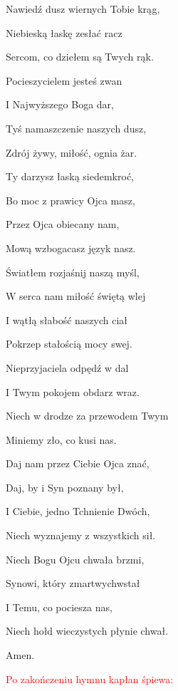 \begin{Parallel}[v]{0.45\textwidth}{0.52\textwidth}
{Nawiedź dusz wiernych Tobie krąg,

Niebieską łaskę zesłać racz

Sercom, co dziełem są Twych rąk.

\quad Pocieszycielem jesteś zwan

I Najwyższego Boga dar,

Tyś namaszczenie naszych dusz,

Zdrój żywy, miłość, ognia żar.

\quad Ty darzysz łaską siedemkroć,

Bo moc z prawicy Ojca masz,

Przez Ojca obiecany nam,

Mową wzbogacasz język nasz.

\quad Światłem rozjaśnij naszą myśl,

W serca nam miłość świętą wlej

I wątłą słabość naszych ciał

Pokrzep stałością mocy swej.

\quad Nieprzyjaciela odpędź w dal

I Twym pokojem obdarz wraz.

Niech w drodze za przewodem Twym

Miniemy zło, co kusi nas.

\quad Daj nam przez Ciebie Ojca znać,

Daj, by i Syn poznany był,

I Ciebie, jedno Tchnienie Dwóch,

Niech wyznajemy z wszystkich sił.

\quad Niech Bogu Ojcu chwała brzmi,

Synowi, który zmartwychwstał

I Temu, co pociesza nas,

Niech hołd wieczystych płynie chwał. 

Amen.
}
\end{Parallel}

\newpage

\begin{center}
\textcolor{red}{Po zakończeniu hymnu kapłan śpiewa:}
\end{center}

